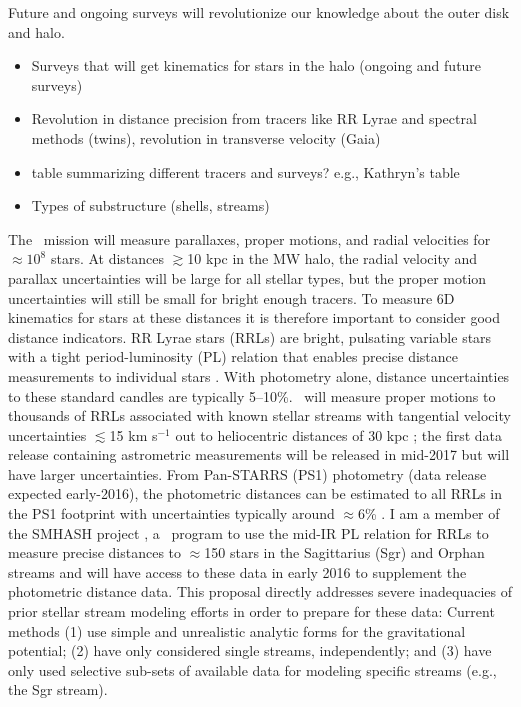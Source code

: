 Future and ongoing surveys will revolutionize our knowledge about the outer disk
and halo.

\begin{itemize}
    \item Surveys that will get kinematics for stars in the halo (ongoing and
    future surveys)
    \item Revolution in distance precision from tracers like RR Lyrae and
    spectral methods (twins), revolution in transverse velocity (Gaia)
    \item table summarizing different tracers and surveys? e.g., Kathryn's table
    \item Types of substructure (shells, streams)
\end{itemize}

The \gaia\ mission will measure parallaxes, proper motions, and radial
velocities for $\approx$$10^{8}$ stars. At distances $\gtrsim$10 kpc in the MW
halo, the radial velocity and parallax uncertainties will be large for all
stellar types, but the proper motion uncertainties will still be small for
bright enough tracers. To measure  6D kinematics for stars at these distances it
is therefore important to consider good distance indicators. RR Lyrae stars
(RRLs) are bright, pulsating variable stars with a tight period-luminosity (PL)
relation that enables precise distance measurements to individual stars
\citep{klein14}. With photometry alone, distance uncertainties to these standard
candles are typically 5--10\%. \gaia\ will measure proper motions to thousands
of RRLs associated with known stellar streams with tangential velocity
uncertainties $\lesssim$15 km s$^{-1}$ out to heliocentric distances of 30 kpc
\citep{apw13}; the first data release containing astrometric measurements will
be released in mid-2017 but will have larger uncertainties. From Pan-STARRS
(PS1) photometry (data release expected early-2016), the photometric distances
can be estimated to all RRLs in the PS1 footprint with uncertainties typically
around $\approx$6\% \citep{sesar13b}. I am a member of the SMHASH project
\citep{smashprop}, a \spitzer\ program to use the mid-IR PL relation for RRLs to
measure precise distances to $\approx$150 stars in the Sagittarius (Sgr) and
Orphan streams and will have access to these data in early 2016 to supplement
the photometric distance data. This proposal directly addresses severe
inadequacies of prior stellar stream modeling efforts in order to prepare for
these data: Current methods (1) use simple and unrealistic analytic forms for
the gravitational potential; (2) have only considered single streams,
independently; and (3) have only used selective sub-sets of available data for
modeling specific streams (e.g., the Sgr stream).

